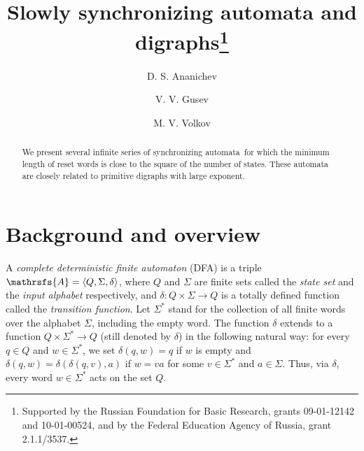 \documentclass[11pt]{llncs}
\newcommand{\sa}{synchronizing automata}
\begin{document}
\title{Slowly synchronizing automata and digraphs\thanks{Supported
by the Russian Foundation for Basic Research, grants 09-01-12142
and 10-01-00524, and by the Federal Education Agency of Russia,
grant 2.1.1/3537.}}


\author{D. S. Ananichev \and V. V. Gusev \and M. V. Volkov}




\maketitle

\begin{abstract}
We present several infinite series of \sa\ for which
the minimum length of reset words is close to the
square of the number of states. These automata are
closely related to primitive digraphs with large exponent.
\end{abstract}


\section{Background and overview}
\label{intro}

A \emph{complete deterministic finite automaton} (DFA) is a triple
$\mathrsfs{A}=\langle Q,\Sigma,\delta\rangle$, where $Q$ and
$\Sigma$ are finite sets called the \emph{state set} and the
\emph{input alphabet} respectively, and $\delta:Q\times\Sigma\to
Q$ is a totally defined function called the \emph{transition
function}. Let $\Sigma^*$ stand for the collection of all finite
words over the alphabet $\Sigma$, including the empty word.
The function $\delta$ extends to a function $Q\times\Sigma^*\to Q$
(still denoted by $\delta$) in the following natural way: for every
$q\in Q$ and $w\in\Sigma^*$, we set $\delta(q,w)=q$ if $w$ is empty
and $\delta(q,w)=\delta(\delta(q,v),a)$ if $w=va$ for some $v\in\Sigma^*$
and $a\in\Sigma$. Thus, via $\delta$, every word $w\in\Sigma^*$ acts
on the set $Q$.
\end{document}
